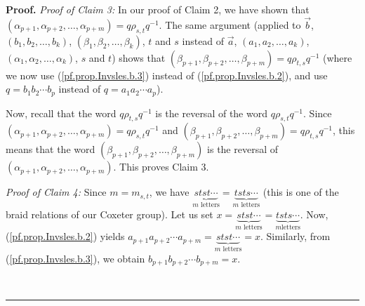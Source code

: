\documentclass
[numbers=enddot,12pt,final,onecolumn,notitlepage,abstracton]{scrartcl}%
\theoremstyle{definition}
\newenvironment{proof}[1][Proof]{\noindent\textbf{#1.} }{\ \rule{0.5em}{0.5em}}
\begin{document}
\begin{proof}
\textit{Proof of Claim 3:} In our proof of Claim 2, we have shown that
$\left(  \alpha_{p+1},\alpha_{p+2},\ldots,\alpha_{p+m}\right)  =q\rho
_{s,t}q^{-1}$. The same argument (applied to $\overrightarrow{b}$, $\left(
b_{1},b_{2},\ldots,b_{k}\right)  $, $\left(  \beta_{1},\beta_{2},\ldots
,\beta_{k}\right)  $, $t$ and $s$ instead of $\overrightarrow{a}$, $\left(
a_{1},a_{2},\ldots,a_{k}\right)  $, $\left(  \alpha_{1},\alpha_{2}%
,\ldots,\alpha_{k}\right)  $, $s$ and $t$) shows that $\left(  \beta
_{p+1},\beta_{p+2},\ldots,\beta_{p+m}\right)  =q\rho_{t,s}q^{-1}$ (where we
now use (\ref{pf.prop.Invsles.b.3}) instead of (\ref{pf.prop.Invsles.b.2}),
and use $q=b_{1}b_{2}\cdots b_{p}$ instead of $q=a_{1}a_{2}\cdots a_{p}$).

Now, recall that the word $q\rho_{t,s}q^{-1}$ is the reversal of the word
$q\rho_{s,t}q^{-1}$. Since \newline$\left(  \alpha_{p+1},\alpha_{p+2}%
,\ldots,\alpha_{p+m}\right)  =q\rho_{s,t}q^{-1}$ and $\left(  \beta
_{p+1},\beta_{p+2},\ldots,\beta_{p+m}\right)  =q\rho_{t,s}q^{-1}$, this means
that the word $\left(  \beta_{p+1},\beta_{p+2},\ldots,\beta_{p+m}\right)  $ is
the reversal of $\left(  \alpha_{p+1},\alpha_{p+2},\ldots,\alpha_{p+m}\right)
$. This proves Claim 3.

\textit{Proof of Claim 4:} Since $m=m_{s,t}$, we have $\underbrace{stst\cdots
}_{m\text{ letters}}=\underbrace{tsts\cdots}_{m\text{ letters}}$ (this is one
of the braid relations of our Coxeter group). Let us set
$x=\underbrace{stst\cdots}_{m\text{ letters}}=\underbrace{tsts\cdots}_{m\text{
letters}}$. Now, (\ref{pf.prop.Invsles.b.2}) yields $a_{p+1}a_{p+2}\cdots
a_{p+m}=\underbrace{stst\cdots}_{m\text{ letters}}=x$. Similarly, from
(\ref{pf.prop.Invsles.b.3}), we obtain $b_{p+1}b_{p+2}\cdots b_{p+m}=x$.


\end{proof}
\end{document}
